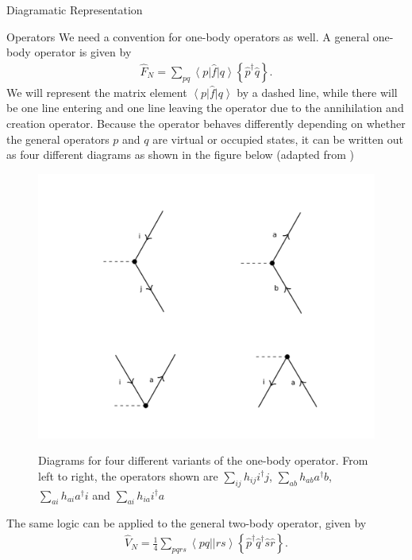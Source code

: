 \documentclass[twoside,english]{uiofysmaster}
\begin{document}
\begin{chapter}{Diagramatic Representation}
	\begin{section}{Operators}
		We need a convention for one-body operators as well. A general one-body operator is given by 
		\begin{align}
			\hat F_N = \sum_{pq} \left< p \right| \hat f \left| q \right> \left\{ \hat p^\dagger \hat q \right\}.
		\end{align}
		We will represent the matrix element $\left< p \right|
                \hat f \left| q \right>$ by a dashed line, while there
                will be one line entering and one line leaving the
                operator due to the annihilation and creation
                operator. Because the operator behaves differently
                depending on whether the general operators $p$ and $q$
                are virtual or occupied states, it can be  written out as 
               four different diagrams as shown in 
                the figure below (adapted from \cite{ShavittAndBartlett})
		\begin{figure}[H]
			\includegraphics[width=\textwidth]{Figures/OneBodyOperator.pdf}
			\label{OneBodyOperator}
			\caption{Diagrams for four different variants of the one-body operator. From left to right, the operators shown are $\sum_{ij} h_{ij} i^\dagger j $, $\sum_{ab} h_{ab} a^\dagger b$, $\sum_{ai}h_{ai} a^\dagger i$ and $\sum_{ai} h_{ia} i^\dagger a$}
		\end{figure}
		The same logic can be applied to the general two-body operator, given by 
		\begin{align}
			\hat V_N = \frac{1}{4} \sum_{pqrs} \left<pq||rs\right> \left\{ \hat p^\dagger \hat q^\dagger \hat s \hat r \right\}.

\end{align}
\end{section}
\end{chapter}
\end{document}
